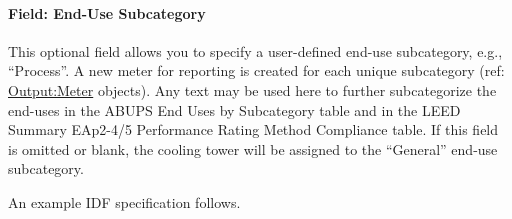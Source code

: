 \paragraph{Field: End-Use Subcategory}\label{end-use-subcategory-03}

This optional field allows you to specify a user-defined end-use subcategory, e.g., ``Process''. A new meter for reporting is created for each unique subcategory (ref: \hyperref[outputmeter-and-outputmetermeterfileonly]{Output:Meter} objects). Any text may be used here to further subcategorize the end-uses in the ABUPS End Uses by Subcategory table and in the LEED Summary EAp2-4/5 Performance Rating Method Compliance table. If this field is omitted or blank, the cooling tower will be assigned to the ``General'' end-use subcategory.

An example IDF specification follows.

